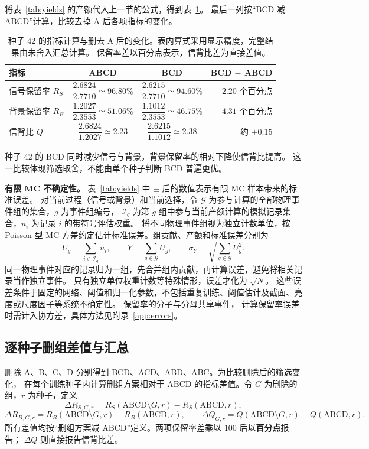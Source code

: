 \documentclass[11pt,a4paper,fontset=fandol,scheme=plain]{ctexart}
\begin{document}
将表~\ref{tab:yields} 的产额代入上一节的公式，得到表~\ref{tab:worked-metrics}。
最后一列按“BCD 减 ABCD”计算，比较去掉 A 后各项指标的变化。
\begin{table}[H]
\caption{种子 42 的指标计算与删去 A 后的变化。表内算式采用显示精度，完整结果由未舍入汇总计算。
保留率差以百分点表示，信背比差为直接差值。}
\label{tab:worked-metrics}
\centering\small
\renewcommand{\arraystretch}{2.6}
\begin{tabular}{lccr}
\toprule
指标 & ABCD & BCD & BCD $-$ ABCD \\
\midrule
信号保留率 $R_S$ & $\dfrac{2.6824}{2.7710}\simeq96.80\%$ & $\dfrac{2.6215}{2.7710}\simeq94.60\%$ & $-2.20$ 个百分点 \\
背景保留率 $R_B$ & $\dfrac{1.2027}{2.3553}\simeq51.06\%$ & $\dfrac{1.1012}{2.3553}\simeq46.75\%$ & $-4.31$ 个百分点 \\
信背比 $Q$ & $\dfrac{2.6824}{1.2027}\simeq2.23$ & $\dfrac{2.6215}{1.1012}\simeq2.38$ & 约 $+0.15$ \\
\bottomrule
\end{tabular}
\end{table}
种子 42 的 BCD 同时减少信号与背景，背景保留率的相对下降使信背比提高。
这一比较体现筛选取舍，不能由单个种子判断 BCD 普遍更优。

\textbf{有限 MC 不确定性。}
表~\ref{tab:yields} 中 $\pm$ 后的数值表示有限 MC 样本带来的标准误差。
对当前过程（信号或背景）和当前选择，令 $\mathcal G$ 为参与计算的全部物理事件组的集合，$g$ 为事件组编号，
$\mathcal I_g$ 为第 $g$ 组中参与当前产额计算的模拟记录集合，$u_i$ 为记录 $i$ 的带符号评估权重。
将不同物理事件组视为独立计数单位，按 Poisson 型 MC 方差约定估计标准误差。组贡献、产额和标准误差分别为
\[
 U_g=\sum_{i\in\mathcal I_g}u_i,\qquad
 Y=\sum_{g\in\mathcal G}U_g,\qquad
 \sigma_Y=\sqrt{\sum_{g\in\mathcal G}U_g^2}.
\]
同一物理事件对应的记录归为一组，先合并组内贡献，再计算误差，避免将相关记录当作独立事件。
只有独立单位权重计数等特殊情形，误差才化为 $\sqrt{N}$。
这些误差条件于固定的网络、阈值和归一化参数，不包括重复训练、阈值估计及截面、亮度或尺度因子等系统不确定性。
保留率的分子与分母共享事件，
计算保留率误差时需计入协方差，具体方法见附录~\ref{app:errors}。


\subsection{逐种子删组差值与汇总}
删除 A、B、C、D 分别得到 BCD、ACD、ABD、ABC。为比较删除后的筛选变化，
在每个训练种子内计算删组方案相对于 ABCD 的指标差值。令 $G$ 为删除的组，$r$ 为种子，定义
\[
 \Delta R_{S,G,r}=R_S(\mathrm{ABCD}\setminus G,r)-R_S(\mathrm{ABCD},r),
\]
\[
 \Delta R_{B,G,r}=R_B(\mathrm{ABCD}\setminus G,r)-R_B(\mathrm{ABCD},r),\qquad
 \Delta Q_{G,r}=Q(\mathrm{ABCD}\setminus G,r)-Q(\mathrm{ABCD},r).
\]
所有差值均按“删组方案减 ABCD”定义。两项保留率差乘以 100 后以\textbf{百分点}报告；
$\Delta Q$ 则直接报告信背比差。
\end{document}
